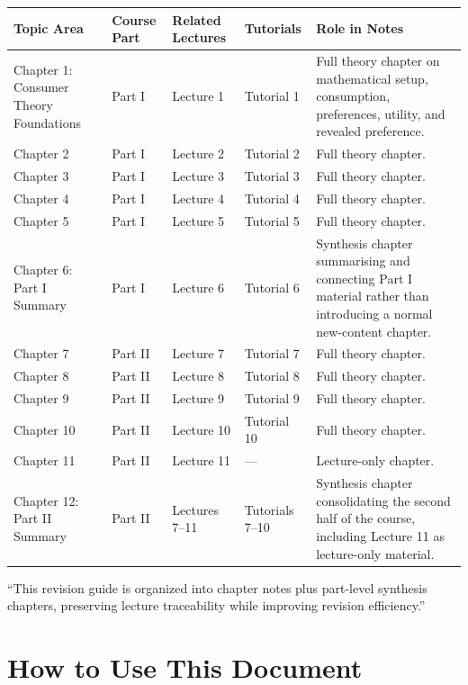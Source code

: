 \documentclass[12pt]{article}
\begin{document}
\begin{center}
\renewcommand{\arraystretch}{1.2}
\begin{tabular}{|p{3.0cm}|p{2.0cm}|p{2.8cm}|p{2.0cm}|p{4.8cm}|}
\hline
\textbf{Topic Area} & \textbf{Course Part} & \textbf{Related Lectures} & \textbf{Tutorials} & \textbf{Role in Notes} \\
\hline
Chapter 1: Consumer Theory Foundations & Part I & Lecture 1 & Tutorial 1 & Full theory chapter on mathematical setup, consumption, preferences, utility, and revealed preference. \\
\hline
Chapter 2 & Part I & Lecture 2 & Tutorial 2 & Full theory chapter. \\
\hline
Chapter 3 & Part I & Lecture 3 & Tutorial 3 & Full theory chapter. \\
\hline
Chapter 4 & Part I & Lecture 4 & Tutorial 4 & Full theory chapter. \\
\hline
Chapter 5 & Part I & Lecture 5 & Tutorial 5 & Full theory chapter. \\
\hline
Chapter 6: Part I Summary & Part I & Lecture 6 & Tutorial 6 & Synthesis chapter summarising and connecting Part I material rather than introducing a normal new-content chapter. \\
\hline
Chapter 7 & Part II & Lecture 7 & Tutorial 7 & Full theory chapter. \\
\hline
Chapter 8 & Part II & Lecture 8 & Tutorial 8 & Full theory chapter. \\
\hline
Chapter 9 & Part II & Lecture 9 & Tutorial 9 & Full theory chapter. \\
\hline
Chapter 10 & Part II & Lecture 10 & Tutorial 10 & Full theory chapter. \\
\hline
Chapter 11 & Part II & Lecture 11 & --- & Lecture-only chapter. \\
\hline
Chapter 12: Part II Summary & Part II & Lectures 7--11 & Tutorials 7--10 & Synthesis chapter consolidating the second half of the course, including Lecture 11 as lecture-only material. \\
\hline
\end{tabular}
\end{center}

\noindent
``This revision guide is organized into chapter notes plus part-level synthesis chapters, preserving lecture traceability while improving revision efficiency.''

\newpage

\section*{How to Use This Document}
\end{document}

